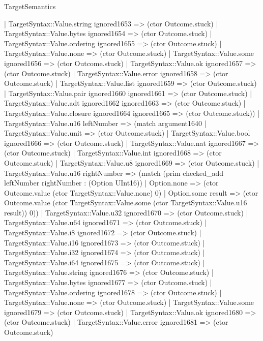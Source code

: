 \begin{lexlean}{TargetSemantics}
\begin{semanticmodule}
{              | TargetSyntax::Value.string ignored1653 => (ctor Outcome.stuck)
              | TargetSyntax::Value.bytes ignored1654 => (ctor Outcome.stuck)
              | TargetSyntax::Value.ordering ignored1655 => (ctor Outcome.stuck)
              | TargetSyntax::Value.none => (ctor Outcome.stuck)
              | TargetSyntax::Value.some ignored1656 => (ctor Outcome.stuck)
              | TargetSyntax::Value.ok ignored1657 => (ctor Outcome.stuck)
              | TargetSyntax::Value.error ignored1658 => (ctor Outcome.stuck)
              | TargetSyntax::Value.list ignored1659 => (ctor Outcome.stuck)
              | TargetSyntax::Value.pair ignored1660 ignored1661 => (ctor Outcome.stuck)
              | TargetSyntax::Value.adt ignored1662 ignored1663 => (ctor Outcome.stuck)
              | TargetSyntax::Value.closure ignored1664 ignored1665 => (ctor Outcome.stuck))
            | TargetSyntax::Value.u16 leftNumber => (match argument1640
              | TargetSyntax::Value.unit => (ctor Outcome.stuck)
              | TargetSyntax::Value.bool ignored1666 => (ctor Outcome.stuck)
              | TargetSyntax::Value.nat ignored1667 => (ctor Outcome.stuck)
              | TargetSyntax::Value.int ignored1668 => (ctor Outcome.stuck)
              | TargetSyntax::Value.u8 ignored1669 => (ctor Outcome.stuck)
              | TargetSyntax::Value.u16 rightNumber => (match (prim checked_add leftNumber rightNumber : (Option UInt16))
                | Option.none => (ctor Outcome.value (ctor TargetSyntax::Value.none) 0)
                | Option.some result => (ctor Outcome.value (ctor TargetSyntax::Value.some (ctor TargetSyntax::Value.u16 result)) 0))
              | TargetSyntax::Value.u32 ignored1670 => (ctor Outcome.stuck)
              | TargetSyntax::Value.u64 ignored1671 => (ctor Outcome.stuck)
              | TargetSyntax::Value.i8 ignored1672 => (ctor Outcome.stuck)
              | TargetSyntax::Value.i16 ignored1673 => (ctor Outcome.stuck)
              | TargetSyntax::Value.i32 ignored1674 => (ctor Outcome.stuck)
              | TargetSyntax::Value.i64 ignored1675 => (ctor Outcome.stuck)
              | TargetSyntax::Value.string ignored1676 => (ctor Outcome.stuck)
              | TargetSyntax::Value.bytes ignored1677 => (ctor Outcome.stuck)
              | TargetSyntax::Value.ordering ignored1678 => (ctor Outcome.stuck)
              | TargetSyntax::Value.none => (ctor Outcome.stuck)
              | TargetSyntax::Value.some ignored1679 => (ctor Outcome.stuck)
              | TargetSyntax::Value.ok ignored1680 => (ctor Outcome.stuck)
              | TargetSyntax::Value.error ignored1681 => (ctor Outcome.stuck)
}
\end{semanticmodule}
\end{lexlean}
